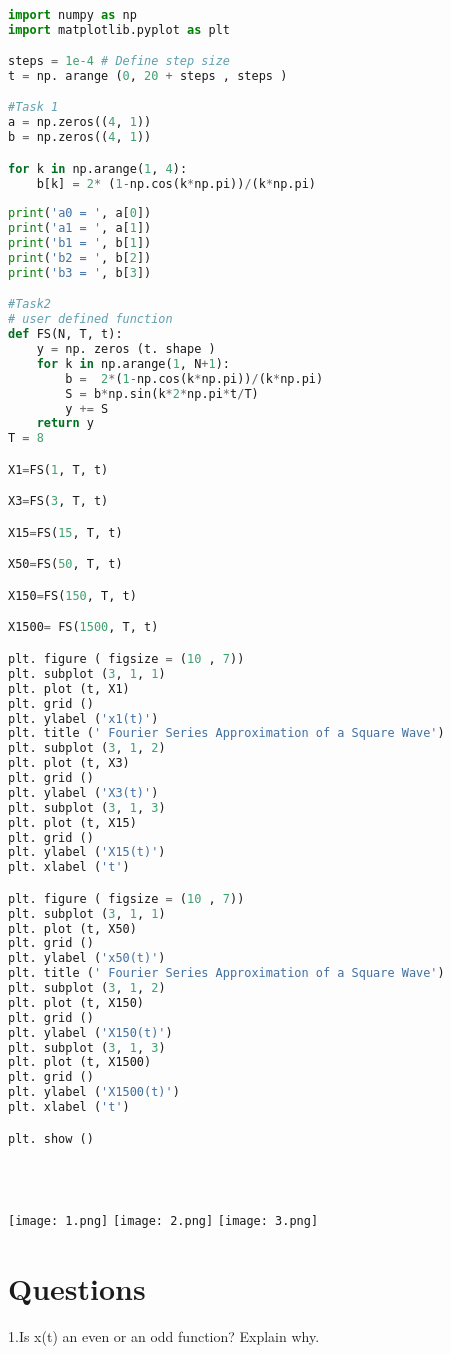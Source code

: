\documentclass[12pt]{report}
\begin{document}
\begin{lstlisting}[language=Python]

import numpy as np
import matplotlib.pyplot as plt

steps = 1e-4 # Define step size
t = np. arange (0, 20 + steps , steps ) 

#Task 1
a = np.zeros((4, 1))
b = np.zeros((4, 1))

for k in np.arange(1, 4):
    b[k] = 2* (1-np.cos(k*np.pi))/(k*np.pi)
    
print('a0 = ', a[0])
print('a1 = ', a[1])
print('b1 = ', b[1])
print('b2 = ', b[2])
print('b3 = ', b[3])

#Task2
# user defined function
def FS(N, T, t): 
    y = np. zeros (t. shape ) 
    for k in np.arange(1, N+1):
        b =  2*(1-np.cos(k*np.pi))/(k*np.pi)
        S = b*np.sin(k*2*np.pi*t/T)
        y += S
    return y 
T = 8

X1=FS(1, T, t)

X3=FS(3, T, t)

X15=FS(15, T, t)

X50=FS(50, T, t)

X150=FS(150, T, t)

X1500= FS(1500, T, t)

plt. figure ( figsize = (10 , 7))
plt. subplot (3, 1, 1)
plt. plot (t, X1)
plt. grid ()
plt. ylabel ('x1(t)')
plt. title (' Fourier Series Approximation of a Square Wave')
plt. subplot (3, 1, 2)
plt. plot (t, X3)
plt. grid ()
plt. ylabel ('X3(t)')
plt. subplot (3, 1, 3)
plt. plot (t, X15)
plt. grid ()
plt. ylabel ('X15(t)')
plt. xlabel ('t')

plt. figure ( figsize = (10 , 7))
plt. subplot (3, 1, 1)
plt. plot (t, X50)
plt. grid ()
plt. ylabel ('x50(t)')
plt. title (' Fourier Series Approximation of a Square Wave')
plt. subplot (3, 1, 2)
plt. plot (t, X150)
plt. grid ()
plt. ylabel ('X150(t)')
plt. subplot (3, 1, 3)
plt. plot (t, X1500)
plt. grid ()
plt. ylabel ('X1500(t)')
plt. xlabel ('t')

plt. show ()





\end{lstlisting}

\texttt{[image: 1.png]}
\texttt{[image: 2.png]}
\texttt{[image: 3.png]}







\section{Questions}
1.Is x(t) an even or an odd function? Explain why.
\end{document}
